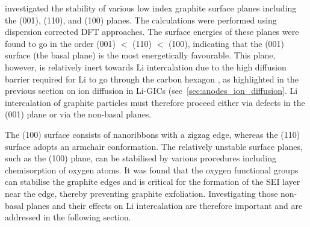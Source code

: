 \documentclass[../main.tex]{subfiles}
\begin{document}
\citeauthor{Rana-Graphite-Surf} investigated the stability of various low index graphite surface planes including the (001), (110), and (100) planes. The calculations were performed using dispersion corrected DFT approaches.\cite{Grimme-2,Grimme-4} The surface energies of these planes were found to go in the order (001) $<$ (110) $<$ (100), \cite{Rana-Graphite-Surf} indicating that the (001) surface (the basal plane) is the most energetically favourable. This plane, however, is relatively inert towards Li intercalation due to the high diffusion barrier required for Li to go through the carbon hexagon \cite{thinius2014theoretical,persson2010}, as highlighted in the previous section on ion diffusion in Li-GICs (sec~\ref{sec:anodes_ion_diffusion}. Li intercalation of graphite particles must therefore proceed either via defects in the (001) plane or via the non-basal planes.

The (100) surface consists of nanoribbons with a zigzag edge, whereas the (110) surface adopts an armchair conformation. The relatively unstable surface planes, such as the (100) plane, can be stabilised by various procedures including chemisorption of oxygen atoms.\cite{Rosanna} It was found that the oxygen functional groups can stabilise the graphite edges and is critical for the formation of the SEI layer near the edge, thereby preventing graphite exfoliation.\cite{bernardo2015influence} Investigating those non-basal planes and their effects on Li intercalation are therefore important and are addressed in the following section.
\end{document}

